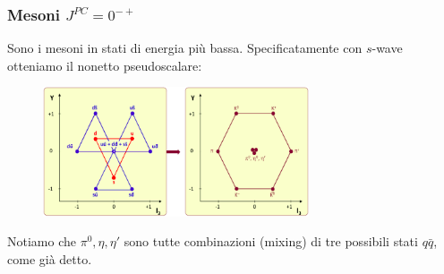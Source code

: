 \subsubsection{Mesoni $J^{PC}=0^{-+}$}
Sono i mesoni in stati di energia più bassa. Specificatamente con $s$-wave otteniamo il nonetto pseudoscalare:
\begin{figure}[H]
    \centering
    \includegraphics[width=0.7\textwidth]{immagini/fig_pseudoscalar_mesons.png}
  \end{figure}
  Notiamo che $\pi^0,\eta,\eta'$ sono tutte combinazioni (mixing) di tre possibili stati $q\bar q$, come già detto.
